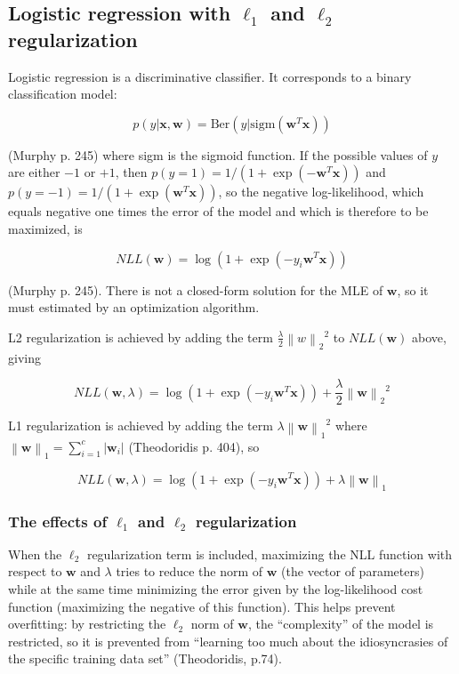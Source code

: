 \documentclass[letterpaper, 12pt]{article}
\newcommand{\norm}[1]{\left\lVert #1 \right\rVert}
\newcommand{\vect}[1]{\boldsymbol{#1}}
\begin{document}
\subsection{Logistic regression with $\ell_1$ and $\ell_2$ regularization}

Logistic regression is a discriminative classifier. It corresponds to a binary classification model:

\begin{equation*}
  p(y | \vect{x}, \vect{w}) = \text{Ber}(y | \text{sigm}(\vect{w}^T\vect{x}))
\end{equation*}

(Murphy p. 245) where sigm is the sigmoid function. If the possible values of $y$ are either $-1$ or $+1$, then $p(y = 1) = 1 / (1 + \exp(-\vect{w}^T\vect{x}))$ and $p(y = -1) = 1 / (1 + \exp(\vect{w}^T\vect{x}))$, so the negative log-likelihood, which equals negative one times the error of the model and which is therefore to be maximized, is

\begin{equation*}
  NLL(\vect{w}) = \log(1 + \exp(-y_i \vect{w}^T\vect{x}))
\end{equation*}

(Murphy p. 245). There is not a closed-form solution for the MLE of $\vect{w}$, so it must estimated by an optimization algorithm.

L2 regularization is achieved by adding the term $\frac{\lambda}{2} {\norm{w}_2}^2$ to $NLL(\vect{w})$ above, giving

\begin{equation*}
  NLL(\vect{w}, \lambda) = \log(1 + \exp(-y_i \vect{w}^T\vect{x})) + \frac{\lambda}{2} {\norm{\vect{w}}_2}^2
\end{equation*}

L1 regularization is achieved by adding the term $\lambda {\norm{\vect{w}}_1}^2$ where $\norm{\vect{w}}_1 = \sum_{i=1}^{c} |\vect{w}_i|$ (Theodoridis p. 404), so

\begin{equation*}
  NLL(\vect{w}, \lambda) = \log(1 + \exp(-y_i \vect{w}^T\vect{x})) + \lambda {\norm{\vect{w}}_1}
\end{equation*}

\subsubsection{The effects of $\ell_1$ and $\ell_2$ regularization}

When the $\ell_2$ regularization term is included, maximizing the NLL function with respect to $\vect{w}$ and $\lambda$ tries to reduce the norm of $\vect{w}$ (the vector of parameters) while at the same time minimizing the error given by the log-likelihood cost function (maximizing the negative of this function). This helps prevent overfitting: by restricting the $\ell_2$ norm of $\vect{w}$, the ``complexity'' of the model is restricted, so it is prevented from ``learning too much about the idiosyncrasies of the specific training data set'' (Theodoridis, p.74).
\end{document}
